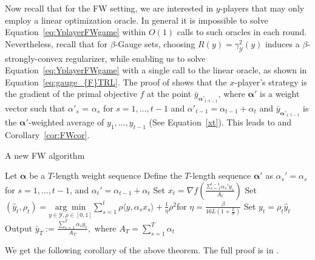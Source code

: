 \documentclass[pmlr]{jmlr} %
\def\balpha{\boldsymbol{\alpha}}
\newcommand{\YY}{\mathcal{Y}}
\begin{document}
Now recall that for the FW setting, we are interested in $y$-players that may only employ a linear optimization oracle. In general it is impossible to solve Equation~\eqref{eq:YplayerFWgame} within $O(1)$ calls to such oracles in each round. Nevertheless, recall that for $\beta$-Gauge sets, choosing $R(y) = \gamma_{\YY}^{2}(y)$ induces a 
$\beta$-strongly-convex regularizer, while enabling us to solve Equation~\eqref{eq:YplayerFWgame} with a single call to the linear oracle, as shown in Equation~\ref{eq:gauge_{F}TRL}. The proof of  shows that the $x$-player's strategy is the gradient of the primal objective $f$ at the point $\bar{y}_{\balpha'_{1:t-1}}$, where $\balpha'$ is a weight vector such that $\alpha'_{s}$ = $\alpha_{s}$ for $s = 1,\ldots,t-1$ and $\alpha'_{t-1} = \alpha_{t-1} + \alpha_{t}$ and $\bar{y}_{\balpha'_{1:t-1}}$ is the $\balpha'$-weighted average of $y_{1},\ldots,y_{t-1}$ (See Equation~\ref{xt}). This leads to  and Corollary~\ref{cor:FWcor}.

\begin{algorithm}[h] 
	\caption{A new FW algorithm}
	\label{alg:FW}
	\begin{algorithmic}[1]
		\STATE Let $\balpha$ be a $T$-length weight sequence 
		\STATE Define the $T$-length sequence $\balpha'$ as $\alpha_{s}' = \alpha_{s} $ for $s=1,\ldots, t-1$, and $\alpha_{t}' = \alpha_{t-1} + \alpha_{t}$
		\STATE  Set $x_{t} = \nabla f( \frac{\Sigma_{{s=1}}^{t-1} \alpha_{s}' y_{s}}{ A_{t}})$
		\STATE  Set	$(\hat{y}_{t}, \rho_{t}) = \underset{y \in \YY, \rho \in[0,1] }{\arg\min} \sum_{s=1}^{t} \rho \langle  y, \alpha_{s} x_{s} \rangle  +  \frac{1}{\eta} \rho^{2}$\quad for $\eta = \frac{\beta }{ 16L ( 1 + \frac{L}{\sigma})}$
		\STATE Set $y_{t} = \rho_{t} \hat{y}_{t}$                  
		\ENDFOR
		\STATE Output $\bar{y}_{T} := \frac{ \sum_{s=1}^{T} \alpha_{s} y_{s}  }{ A_{T} },$ where $A_{T}= \sum_{s=1}^{T} \alpha_{t}$
	\end{algorithmic}
\end{algorithm}



We get the following corollary of the above theorem. The full proof is in . 
\end{document}
